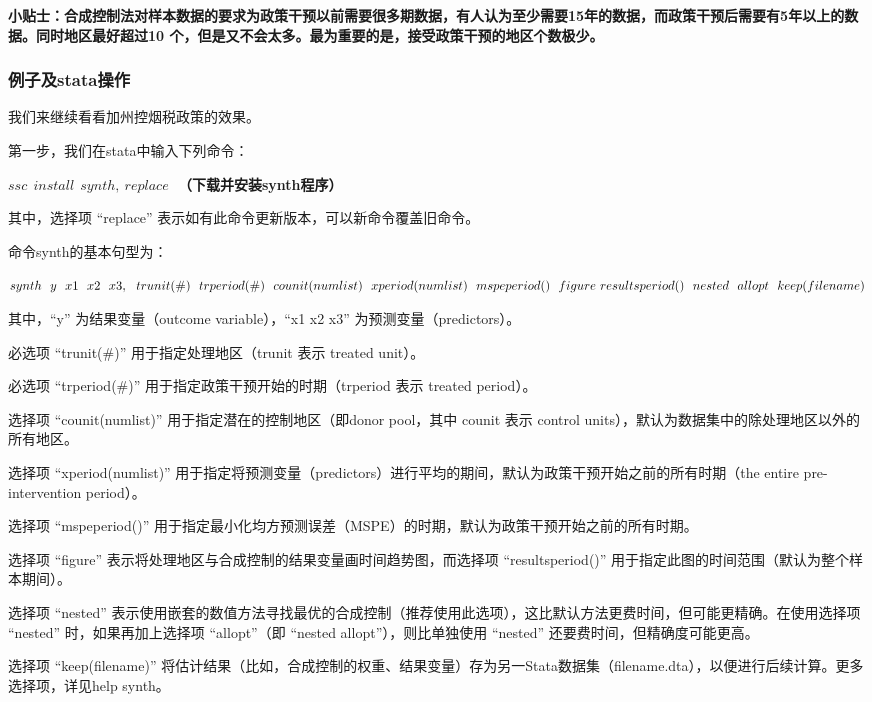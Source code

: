 \documentclass[cn,12pt,math=newtx,citestyle=gb7714-2015,bibstyle=gb7714-2015]{elegantbook}
\begin{document}
	\textbf{小贴士：合成控制法对样本数据的要求为政策干预以前需要很多期数据，有人认为至少需要15年的数据，而政策干预后需要有5年以上的数据。同时地区最好超过10 个，但是又不会太多。最为重要的是，接受政策干预的地区个数极少。}
	
	\subsubsection{例子及stata操作}
	
	我们来继续看看加州控烟税政策的效果。
	
	第一步，我们在stata中输入下列命令：
	
	\textbf{$ssc~~install~~synth,~replace~~~$（下载并安装synth程序）}
	
	其中，选择项 “replace” 表示如有此命令更新版本，可以新命令覆盖旧命令。
	
	命令synth的基本句型为：
	
	\textbf{$synth~~y~~x1~~x2~~x3 ,~~trunit(\#)~~trperiod(\#)~~counit(numlist)~~xperiod(numlist)~~mspeperiod()~~figure~~\\
		resultsperiod()~~nested~~allopt~~keep(filename)$}
	
	其中，“y” 为结果变量（outcome variable），“x1 x2 x3” 为预测变量（predictors）。
	
	必选项 “trunit(\#)” 用于指定处理地区（trunit 表示 treated unit）。
	
	必选项 “trperiod(\#)” 用于指定政策干预开始的时期（trperiod 表示 treated period）。
	
	选择项 “counit(numlist)” 用于指定潜在的控制地区（即donor pool，其中 counit 表示 control units），默认为数据集中的除处理地区以外的所有地区。
	
	选择项 “xperiod(numlist)” 用于指定将预测变量（predictors）进行平均的期间，默认为政策干预开始之前的所有时期（the entire pre-intervention period）。
	
	选择项 “mspeperiod()” 用于指定最小化均方预测误差（MSPE）的时期，默认为政策干预开始之前的所有时期。
	
	选择项 “figure” 表示将处理地区与合成控制的结果变量画时间趋势图，而选择项 “resultsperiod()” 用于指定此图的时间范围（默认为整个样本期间）。
	
	选择项 “nested” 表示使用嵌套的数值方法寻找最优的合成控制（推荐使用此选项），这比默认方法更费时间，但可能更精确。在使用选择项 “nested” 时，如果再加上选择项 “allopt”（即 “nested allopt”），则比单独使用 “nested” 还要费时间，但精确度可能更高。
	
	选择项 “keep(filename)” 将估计结果（比如，合成控制的权重、结果变量）存为另一Stata数据集（filename.dta），以便进行后续计算。更多选择项，详见help synth。
	
\end{document}
